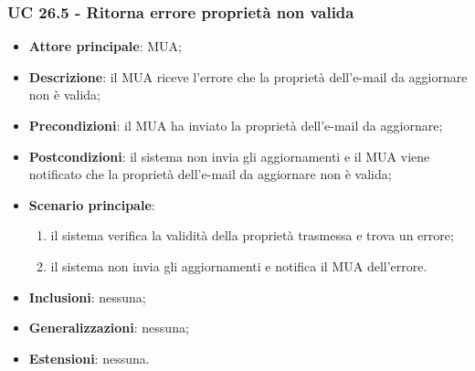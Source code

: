     \subsubsection{UC 26.5 - Ritorna errore proprietà non valida} \label{sec:UC26.5}
    \begin{itemize}
        \item \textbf{Attore principale}: MUA;
        \item \textbf{Descrizione}: il MUA riceve l'errore che la proprietà dell'e-mail da aggiornare non è valida;
        \item \textbf{Precondizioni}: il MUA ha inviato la proprietà dell'e-mail da aggiornare;
        \item \textbf{Postcondizioni}: il sistema non invia gli aggiornamenti e il MUA viene notificato che la proprietà dell'e-mail da aggiornare non è valida;
        \item \textbf{Scenario principale}:
            \begin{enumerate}
                \item il sistema verifica la validità della proprietà trasmessa e trova un errore;
                \item il sistema non invia gli aggiornamenti e notifica il MUA dell'errore.
            \end{enumerate}
        \item \textbf{Inclusioni}: nessuna;
        \item \textbf{Generalizzazioni}: nessuna;
        \item \textbf{Estensioni}: nessuna.
    \end{itemize}